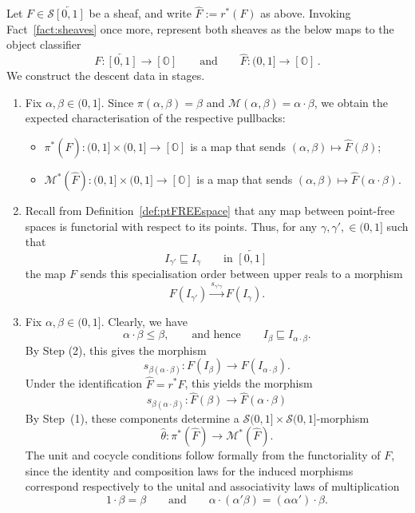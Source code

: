 \documentclass[a4paper, 11pt,reqno]{amsart}
\newcommand{\M}{\mathcal{M}}
\newcommand{\baseS}{\mathcal{S}}
\newcommand{\OC}{{{[\mathbb{O}]}}}
\begin{document}
\begin{construction}\label{cons:inverse-setup} Let $F\in\baseS\overleftarrow{[0,1]}$ be a sheaf, and write $\widehat{F}:=r^*(F)$ as above. Invoking Fact~\ref{fact:sheaves} once more, represent both sheaves as the below maps to the object classifier
	$$F\colon \overleftarrow{[0,1]}\to \OC \qquad\text{and}\qquad  \widehat{F}\colon (0,1]\to \OC\,.$$
We construct the descent data in stages.
\begin{enumerate}
	\item Fix $\alpha,\beta\in (0,1].$ Since $\pi(\alpha,\beta)=\beta$ and $\M(\alpha,\beta)=\alpha\cdot \beta$, we obtain the expected characterisation of the respective pullbacks:
	\begin{itemize}
		\item $\pi^*(\widehat{F})\colon  (0,1]\times(0,1]\rightarrow [\mathbb{O}]$ is a map that sends $(\alpha,\beta)\mapsto \widehat{F}(\beta)$;
		\item $\M^*(\widehat{F})\colon  (0,1]\times(0,1]\rightarrow [\mathbb{O}]$ is a map that sends $(\alpha,\beta)\mapsto \widehat{F}(\alpha\cdot\beta)$.
	\end{itemize}		
\item Recall from Definition~\ref{def:ptFREEspace} that any map between point-free spaces is functorial with respect to its points. Thus, for any $\gamma,\gamma',\in(0,1]$ such that 
$$I_{\gamma'}\sqsubseteq I_{\gamma} \qquad\text{in $\overleftarrow{[0,1]}$}\,$$ 
the map $F$ sends this specialisation order between upper reals to a morphism
\[F(I_{\gamma'})\xrightarrow{s_{\gamma' \gamma}} F(I_{\gamma}).\]
\item Fix $\alpha,\beta\in(0,1]$. Clearly, we have
$$\alpha\cdot\beta\leq\beta,
\qquad\text{and hence}\qquad
I_\beta\sqsubseteq I_{\alpha\cdot\beta}.$$
By Step (2), this gives the morphism  %
\begin{equation}\label{eq:specMORPH1} s_{\beta(\alpha\cdot\beta)}\colon F(I_\beta)\longrightarrow F(I_{\alpha\cdot\beta}).
\end{equation}
Under the identification $\widehat{F}=r^* F$, this yields the morphism
\[s_{\beta(\alpha\cdot\beta)}\colon \widehat{F}(\beta)\longrightarrow \widehat{F}(\alpha\cdot\beta)\]
By Step~(1), these components determine a
$\baseS(0,1]\times\baseS(0,1]$-morphism
\[\widehat{\theta}\colon \pi^*(\widehat{F})\longrightarrow \M^*(\widehat{F}).\]
The unit and cocycle conditions follow formally from the functoriality of $F$, since the identity and composition laws for the induced morphisms correspond respectively to the unital and associativity laws of multiplication
$$1\cdot\beta=\beta
\qquad\text{and}\qquad
\alpha\cdot (\alpha'\beta)=(\alpha\alpha')\cdot \beta.$$
\end{enumerate}	
	

\end{construction}
\end{document}
